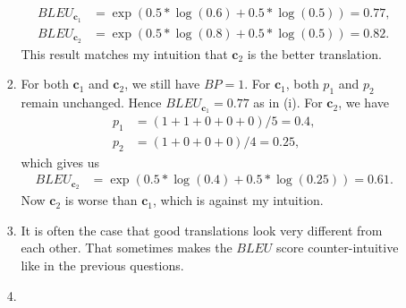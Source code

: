 \documentclass[12pt]{article}
\begin{document}
\begin{enumerate}[label=\textbf{\arabic*.}]
\begin{enumerate}[label=(\alph*)]
\begin{enumerate}[label=\roman*.]
\begin{align*}
        BLEU_{\bm{c}_1}&=\exp(0.5*\log(0.6)+0.5*\log(0.5))=0.77, \\
        BLEU_{\bm{c}_2}&=\exp(0.5*\log(0.8)+0.5*\log(0.5))=0.82.
      \end{align*}
      This result matches my intuition that $\bm{c}_2$ is the better translation.
      \item For both $\bm{c}_1$ and $\bm{c}_2$, we still have $BP=1$. For $\bm{c}_1$, both $p_1$ and $p_2$ remain unchanged. Hence $BLEU_{\bm{c}_1}=0.77$ as in (i). For $\bm{c}_2$, we have
      \begin{align*}
        p_1&=(1+1+0+0+0)/5=0.4, \\
        p_2&=(1+0+0+0)/4=0.25,
      \end{align*}
      which gives us
      \begin{align*}
        BLEU_{\bm{c}_2}&=\exp(0.5*\log(0.4)+0.5*\log(0.25))=0.61.
      \end{align*}
      Now $\bm{c}_2$ is worse than $\bm{c}_1$, which is against my intuition.
      \item It is often the case that good translations look very different from each other. That sometimes makes the $BLEU$ score
      counter-intuitive like in the previous questions.
      \item
    \end{enumerate}
  \end{enumerate}
\end{enumerate}
\end{document}
